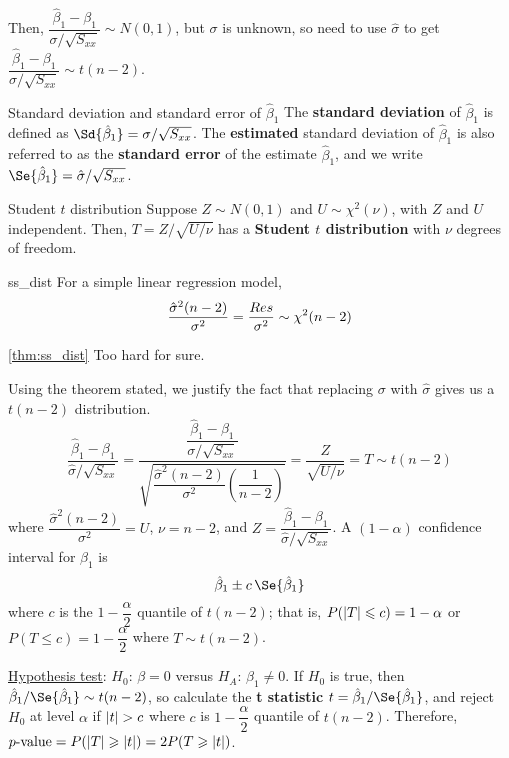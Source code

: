 Then, $ \dfrac{\hat{\beta}_1-\beta_1}{\sigma/\sqrt{S_{xx}}} \sim N(0,1) $,
but $ \sigma $ is unknown, so need to use $ \hat{\sigma} $
to get
$ \dfrac{\hat{\beta}_1-\beta_1}{\hat{\sigma}/\sqrt{S_{xx}}}
    \sim t(n-2) $.
\begin{Definition}{Standard deviation and standard error of $ \hat{\beta}_1 $}{}
    The \textbf{standard deviation} of $ \hat{\beta}_1 $
    is defined as $ \Sd{\hat{\beta}_1}=\sigma/\sqrt{S_{xx}} $.
    The \textbf{estimated} standard deviation of $ \hat{\beta}_1 $
    is also referred to as the \textbf{standard error}
    of the estimate $ \hat{\beta}_1 $, and
    we write $ \Se{\hat{\beta}_1}=\hat{\sigma}/\sqrt{S_{xx}} $.
\end{Definition}
\begin{Definition}{Student $ t $ distribution}{}
    Suppose $ Z \sim N(0,1) $ and $ U \sim \chi^2(\nu) $,
    with $ Z $ and $ U $ independent. Then,
    $ T=Z/\sqrt{U/\nu} $ has a \textbf{Student $t$ distribution}
    with $ \nu $ degrees of freedom.
\end{Definition}
\begin{Theorem}{}{ss_dist}
    For a simple linear regression model,
    \[ \frac{\hat{\sigma}^2(n-2)}{\sigma^2}=\frac{\relax{Res}}{\sigma^2}
        \sim \chi^2(n-2) \]
\end{Theorem}
\begin{Proof}{\ref{thm:ss_dist}}{}
    Too hard for sure.
\end{Proof}
Using the theorem stated, we justify
the fact that replacing $ \sigma $ with $ \hat{\sigma} $
gives us a $ t(n-2) $ distribution.
\[ \frac{\hat{\beta}_1-\beta_1}{\hat{\sigma}/\sqrt{S_{xx}}}
    =\dfrac{\dfrac{\hat{\beta}_1-\beta_1}{\sigma/\sqrt{S_{xx}}}}{
        \sqrt{\dfrac{\hat{\sigma}^2(n-2)}{\sigma^2}\left( \dfrac{1}{n-2} \right)}
    }=
    \frac{Z}{\sqrt{U/\nu}}=T \sim t(n-2)  \]
where $ \dfrac{\hat{\sigma}^2(n-2)}{\sigma^2}=U $,
$ \nu=n-2 $, and $ Z=\dfrac{\hat{\beta}_1-\beta_1}{\hat{\sigma}/\sqrt{S_{xx}}} $.
A $ (1-\alpha) $ confidence interval for $ \beta_1 $ is
\[ \hat{\beta}_1\pm c\,\Se{\hat{\beta}_1} \]
where $ c $ is the $ 1-\dfrac{\alpha}{2} $ quantile
of $ t(n-2) $; that is,
$ P(\lvert T\rvert\leqslant c)=1-\alpha $ or
$ P(T\leqslant c)=1-\dfrac{\alpha}{2} $
where $ T \sim t(n-2) $.

\underline{Hypothesis test}:
$ H_0 $: $ \beta=0 $ versus
$ H_A $: $ \beta_1\neq 0 $.
If $ H_0 $ is true, then $ \hat{\beta}_1/\Se{\hat{\beta}_1} \sim t(n-2) $,
so calculate the \textbf{t statistic}
$ t=\hat{\beta}_1/\Se{\hat{\beta}_1} $,
and reject $ H_0 $ at level $ \alpha $ if $ \lvert t\rvert>c $
where $ c $ is $ 1-\dfrac{\alpha}{2} $ quantile of $ t(n-2) $.
Therefore,
$ p\text{-value}=P(\lvert T\rvert\geqslant \lvert t\rvert)
    =2P(T\geqslant \lvert t\rvert) $.
